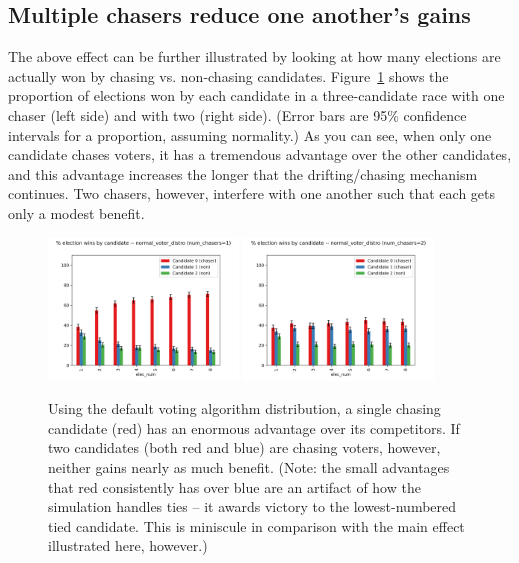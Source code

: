 \subsection{Multiple chasers reduce one another's gains}

The above effect can be further illustrated by looking at how many elections
are actually won by chasing vs. non-chasing candidates.
Figure~\ref{chasing_winners} shows the proportion of elections won by each
candidate in a three-candidate race with one chaser (left side) and with two
(right side). (Error bars are 95\% confidence intervals for a proportion,
assuming normality.) As you can see, when only one candidate chases voters, it
has a tremendous advantage over the other candidates, and this advantage
increases the longer that the drifting/chasing mechanism continues. Two
chasers, however, interfere with one another such that each gets only a modest
benefit.

\begin{figure}[ht]
\centering
\includegraphics[width=0.45\textwidth]{assets/one_chaser_big_benefit.png}
\includegraphics[width=0.45\textwidth]{assets/two_chasers_small_benefit.png}
\caption{Using the default voting algorithm distribution, a single chasing
candidate (red) has an enormous advantage over its competitors. If two
candidates (both red and blue) are chasing voters, however, neither gains
nearly as much benefit. (Note: the small advantages that red consistently has
over blue are an artifact of how the simulation handles ties -- it awards
victory to the lowest-numbered tied candidate. This is miniscule in comparison
with the main effect illustrated here, however.)}
\label{chasing_winners}
\end{figure}

